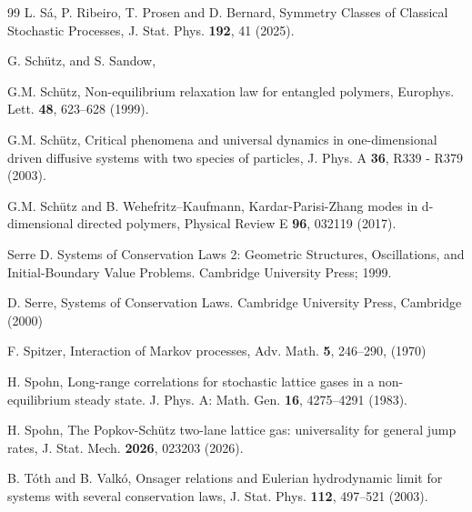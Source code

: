 \documentclass[12pt]{article}
\begin{document}
\begin{thebibliography}{99}
 L. S\'a, P. Ribeiro, T. Prosen and D. Bernard, Symmetry Classes of Classical Stochastic Processes, J. Stat.  Phys. \textbf{192}, 41 (2025).

 G. Sch\"utz, and S. Sandow,


 G.M. Sch\"utz, Non-equilibrium relaxation law for entangled polymers, Europhys. Lett. {\bf 48}, 623--628 (1999).

G.M. Sch\"utz,
Critical phenomena and universal dynamics in one-dimensional
driven diffusive systems with two species of particles,
J. Phys. A \textbf{36}, R339 - R379 (2003).

G.M. Sch\"utz and B. Wehefritz–Kaufmann,
Kardar-Parisi-Zhang modes in d-dimensional directed polymers,
 Physical Review E \textbf{96}, 032119 (2017).

Serre D. Systems of Conservation Laws 2: Geometric Structures, Oscillations, and Initial-Boundary Value Problems. Cambridge University Press; 1999.

D. Serre, Systems of Conservation Laws. Cambridge University Press, Cambridge (2000)

F. Spitzer, 
Interaction of Markov processes,
Adv. Math. \textbf{5}, 246--290, (1970)

H. Spohn, Long-range correlations for stochastic lattice gases in a non-equilibrium steady state. J. Phys. A: Math. Gen. \textbf{16}, 4275--4291 (1983).

%
H. Spohn, 
The Popkov-Schütz two-lane lattice gas: universality for general jump rates,
J. Stat. Mech. \textbf{2026}, 023203 (2026).

B. T\'oth and B. Valk\'o,
Onsager relations and Eulerian hydrodynamic limit for systems with several conservation laws, 
J. Stat. Phys. \textbf{112}, 497--521 (2003).


\end{thebibliography}
\end{document}
